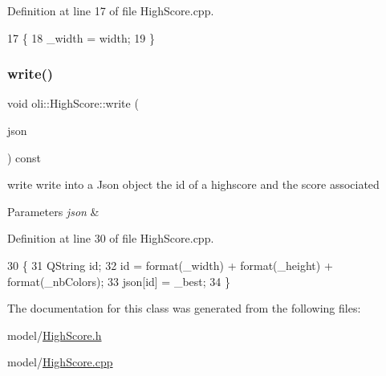 Definition at line 17 of file High\+Score.\+cpp.


\begin{DoxyCode}
17                                  \{
18     \_width = width;
19 \}
\end{DoxyCode}
\hypertarget{classoli_1_1_high_score_a644fb39e171f4176159168fed4b31753}{}\label{classoli_1_1_high_score_a644fb39e171f4176159168fed4b31753} 
\subsubsection{\texorpdfstring{write()}{write()}}
{\footnotesize\ttfamily void oli\+::\+High\+Score\+::write (\begin{DoxyParamCaption}\item[{Q\+Json\+Object \&}]{json }\end{DoxyParamCaption}) const}



write write into a Json object the id of a highscore and the score associated 


\begin{DoxyParams}{Parameters}
{\em json} & \\
\hline
\end{DoxyParams}


Definition at line 30 of file High\+Score.\+cpp.


\begin{DoxyCode}
30                                             \{
31     QString id;
32     \textcolor{keywordtype}{id} = format(\_width) + format(\_height) + format(\_nbColors);
33     json[id] = \_best;
34 \}
\end{DoxyCode}


The documentation for this class was generated from the following files\+:\begin{DoxyCompactItemize}
\item 
model/\hyperlink{_high_score_8h}{High\+Score.\+h}\item 
model/\hyperlink{_high_score_8cpp}{High\+Score.\+cpp}\end{DoxyCompactItemize}
